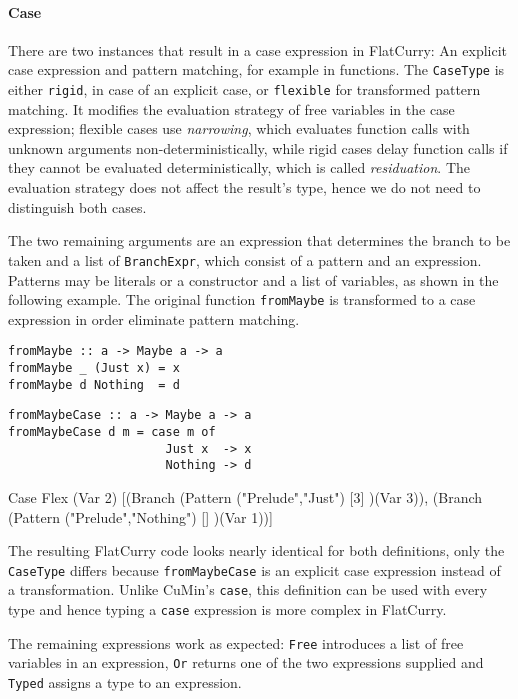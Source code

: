 \documentclass[fleqn]{scrreprt}
\newcommand{\todo}[1]{\marginpar{\textbf{TODO:} #1}}
\newcommand{\coqinline}[1]{\texttt{#1}}
\begin{document}
\paragraph{Case}
There are two instances that result in a case expression in FlatCurry: An explicit case expression and pattern matching, for example in functions. The \coqinline{CaseType} is either \coqinline{rigid}, in case of an explicit case, or \coqinline{flexible} for transformed pattern matching. It modifies the evaluation strategy of free variables in the case expression; flexible cases use \textit{narrowing}, which evaluates function calls with unknown arguments non-deterministically, while rigid cases delay function calls if they cannot be evaluated deterministically, which is called \textit{residuation}.\cite{Hanus13} \todo{Stimmt das?}
The evaluation strategy does not affect the result's type, hence we do not need to distinguish both cases.
\par
The two remaining arguments are an expression that determines the branch to be taken and a list of \coqinline{BranchExpr}, which consist of a pattern and an expression. Patterns may be literals or a constructor and a list of variables, as shown in the following example. The original function \texttt{fromMaybe} is transformed to a case expression in order eliminate pattern matching.\\
\par
\begin{minipage}[t]{.5\linewidth}
\begin{verbatim}
fromMaybe :: a -> Maybe a -> a
fromMaybe _ (Just x) = x
fromMaybe d Nothing  = d
\end{verbatim}
\end{minipage}
\begin{minipage}[t]{.5\linewidth}
\begin{verbatim}
fromMaybeCase :: a -> Maybe a -> a
fromMaybeCase d m = case m of
                      Just x  -> x
                      Nothing -> d
\end{verbatim}
\end{minipage}
\begin{coqcode}
Case Flex (Var 2) [(Branch (Pattern ("Prelude","Just") [3] )(Var 3)),
                   (Branch (Pattern ("Prelude","Nothing") [] )(Var 1))]
\end{coqcode}
The resulting FlatCurry code looks nearly identical for both definitions, only the \coqinline{CaseType} differs because \texttt{fromMaybeCase} is an explicit case expression instead of a transformation. Unlike CuMin's \texttt{case}, this definition can be used with every type and hence typing a \texttt{case} expression is more complex in FlatCurry.\\
\par
The remaining expressions work as expected: \texttt{Free} introduces a list of free variables in an expression, \texttt{Or} returns one of the two expressions supplied and \texttt{Typed} assigns a type to an expression. \todo{Weglassen?}
\end{document}
